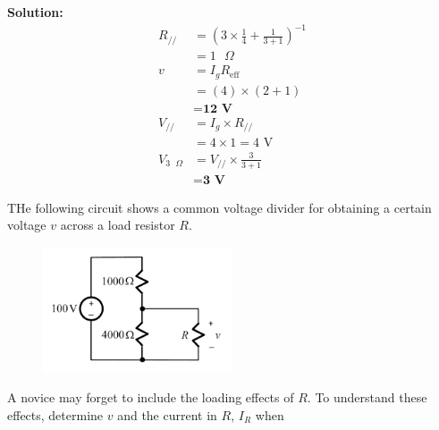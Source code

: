 \documentclass[a4paper, 12pt, addpoints]{exam}
\begin{document}
\begin{questions}
\begin{tcolorbox}
    \textbf{Solution:}
    \begin{align*}
        R_{//} &= (3\times \frac{1}{4} + \frac{1}{3+1})^{-1} \\
        &= 1\text{ }\Omega \\
        v &= I_g R_\text{eff} \\
        &= (4)\times (2+1) \\
        &= \textbf{12 V} \\
        V_{//} &= I_g \times R_{//} \\
        &= 4 \times 1 = \text{4 V} \\
        V_{3\text{ }\Omega} &= V_{//} \times \frac{3}{3+1} \\
        &= \textbf{3 V}
    \end{align*}
\end{tcolorbox}

\question THe following circuit shows a common voltage divider for obtaining a certain voltage $v$ across a load resistor $R$.
\begin{figure}[h!]
    \centering
    \includegraphics[width=0.5\textwidth]{images/Q5.png}
\end{figure}

A novice may forget to include the loading effects of $R$. To understand these effects, determine $v$ and the current in $R$, $I_R$ when
\end{questions}
\end{document}
